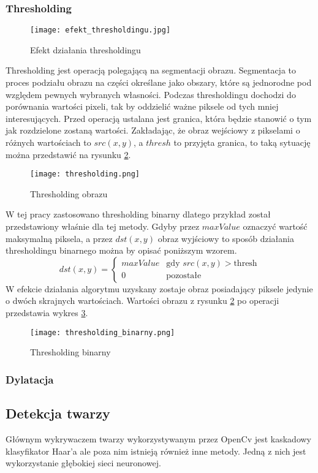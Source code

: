 \subsubsection{Thresholding}
\begin{figure}[H]
	\centering
	\texttt{[image: efekt\_thresholdingu.jpg]}
	\caption{Efekt działania thresholdingu}
	\label{fig:efekt_thresholdingu}
\end{figure}
Thresholding jest operacją polegającą na segmentacji obrazu. Segmentacja to proces podziału obrazu na części określane jako obszary, które są jednorodne pod względem pewnych wybranych własności. Podczas thresholdingu dochodzi do porównania wartości pixeli, tak by oddzielić ważne piksele od tych mniej interesujących. Przed operacją ustalana jest granica, która będzie stanowić o tym jak rozdzielone zostaną wartości.
Zakładając, że obraz wejściowy z pikselami o różnych wartościach to $ src(x,y) $, a $thresh$ to przyjęta granica, to taką sytuację można przedstawić na rysunku \ref{fig:thresholding}.
\begin{figure}[H]
	\centering
	\texttt{[image: thresholding.png]}
	\caption{Thresholding obrazu}
	\label{fig:thresholding}
\end{figure}
W tej pracy zastosowano thresholding binarny dlatego przykład został przedstawiony właśnie dla tej metody. Gdyby przez $maxValue$ oznaczyć wartość maksymalną piksela, a przez $dst(x,y)$ obraz wyjściowy to sposób działania thresholdingu binarnego można by opisać poniższym wzorem.
$$
dst(x,y) = \left\{ \begin{array}{ll}
maxValue & \textrm{gdy $src(x,y)>$thresh}\\
0 & \textrm{pozostałe}
\end{array} \right.
$$
W efekcie działania algorytmu uzyskany zostaje obraz posiadający piksele jedynie o dwóch skrajnych wartościach. Wartości obrazu z rysunku \ref{fig:thresholding} po operacji przedstawia wykres \ref{fig:thresholding_binarny}.
\begin{figure}[H]
	\centering
	\texttt{[image: thresholding\_binarny.png]}
	\caption{Thresholding binarny}
	\label{fig:thresholding_binarny}
\end{figure}
\subsubsection{Dylatacja}

\subsection{Detekcja twarzy}
Głównym wykrywaczem twarzy wykorzystywanym przez OpenCv jest kaskadowy klasyfikator Haar'a ale poza nim istnieją również inne metody. Jedną z nich jest wykorzystanie głębokiej sieci neuronowej.

